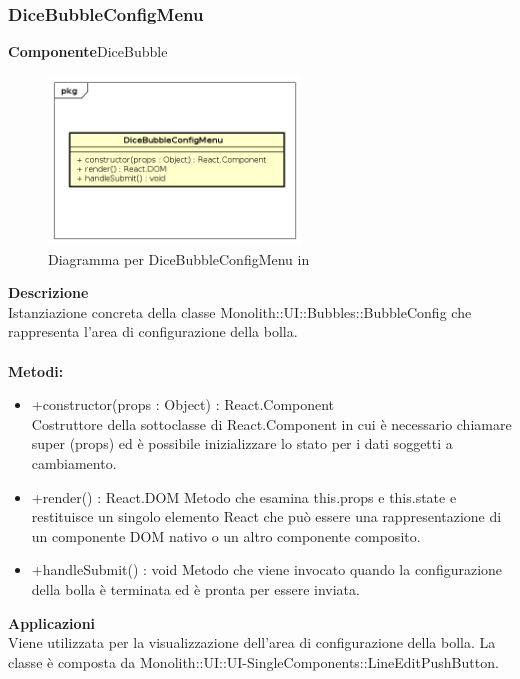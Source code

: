 \subsubsection{DiceBubbleConfigMenu}
\textbf{Componente}DiceBubble\\
   \FloatBarrier
   \begin{figure}[ht]
   \centering
   \includegraphics[width=0.6\textwidth]{img/single-DiceBubbleConfigMenu}
   \caption{{Diagramma per DiceBubbleConfigMenu in }}
\end{figure}
\FloatBarrier
\textbf{Descrizione}\\
Istanziazione concreta della classe Monolith::UI::Bubbles::BubbleConfig che rappresenta l'area di configurazione della bolla. 
\\
\\
\textbf{Metodi:} 
\begin{itemize}
\item +constructor(props : Object) : React.Component 
\\
Costruttore della sottoclasse di React.Component in cui è necessario chiamare super (props) ed è possibile inizializzare lo stato per i dati soggetti a cambiamento.

\item +render() : React.DOM
Metodo che esamina this.props e this.state e restituisce un singolo elemento React che può essere una rappresentazione di un componente DOM nativo o un altro componente composito.

\item +handleSubmit() : void
Metodo che viene invocato quando la configurazione della bolla è terminata ed è pronta per essere inviata.

\end{itemize} 


\textbf{Applicazioni}\\
Viene utilizzata per la visualizzazione dell'area di configurazione della bolla. 
La classe è composta da Monolith::UI::UI-SingleComponents::LineEditPushButton. 



